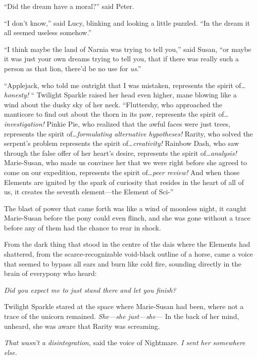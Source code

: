 “Did the dream have a moral?” said Peter.

“I don’t know,” said Lucy, blinking and looking a little puzzled. “In the dream it all seemed useless somehow.”

“I think maybe the land of Narnia was trying to tell you,” said Susan, “or maybe it was just your own dreams trying to tell you, that if there was really such a person as that lion, there’d be no use for \emph{us}.”


“Applejack, who told me outright that I was mistaken, represents the spirit of…\emph{honesty!} “ Twilight Sparkle raised her head even higher, mane blowing like a wind about the dusky sky of her neck. “Fluttershy, who approached the manticore to find out about the thorn in its paw, represents the spirit of…\emph{investigation!} Pinkie Pie, who realized that the awful faces were just trees, represents the spirit of…\emph{formulating alternative hypotheses!} Rarity, who solved the serpent’s problem represents the spirit of…\emph{creativity!} Rainbow Dash, who saw through the false offer of her heart’s desire, represents the spirit of…\emph{analysis!} Marie-Susan, who made us convince her that we were right before she agreed to come on our expedition, represents the spirit of…\emph{peer review!} And when those Elements are ignited by the spark of curiosity that resides in the heart of all of us, it creates the seventh element—the Element of Sci-”

The blast of power that came forth was like a wind of moonless night, it caught Marie-Susan before the pony could even flinch, and she was gone without a trace before any of them had the chance to rear in shock.

From the dark thing that stood in the centre of the dais where the Elements had shattered, from the scarce-recognizable void-black outline of a horse, came a voice that seemed to bypass all ears and burn like cold fire, sounding directly in the brain of everypony who heard:

\emph{Did you expect me to just stand there and let you finish?}

Twilight Sparkle stared at the space where Marie-Susan had been, where not a trace of the unicorn remained. \emph{She—she just—she—} In the back of her mind, unheard, she was aware that Rarity was screaming.

\emph{That wasn’t a disintegration,} said the voice of Nightmare. \emph{I sent her somewhere else.}

